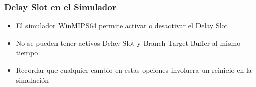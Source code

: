 \documentclass{beamer}
\begin{document}
\begin{frame}
\frametitle{Delay Slot en el Simulador}
\begin{itemize}
\item El simulador WinMIPS64 permite activar o desactivar el Delay Slot
\item No se pueden tener activos Delay-Slot y Branch-Target-Buffer al mismo tiempo
\item Recordar que cualquier cambio en estas opciones involucra un reinicio en la simulación
\end{itemize}
\end{frame}
\end{document}
